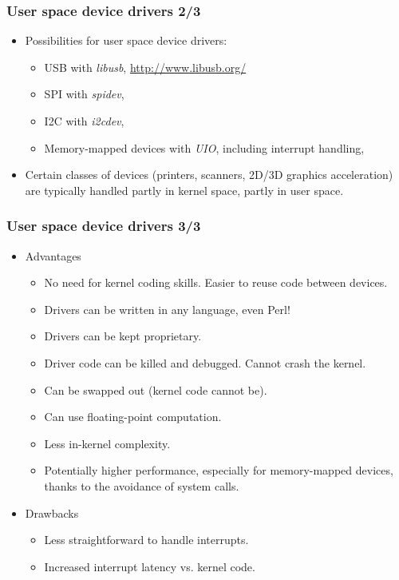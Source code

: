 \begin{frame}
  \frametitle{User space device drivers 2/3}
  \begin{itemize}
  \item Possibilities for user space device drivers:
    \begin{itemize}
    \item USB with {\em libusb}, \url{http://www.libusb.org/}
    \item SPI with {\em spidev}, 
    \item I2C with {\em i2cdev}, 
    \item Memory-mapped devices with {\em UIO}, including interrupt
      handling, 
    \end{itemize}
  \item Certain classes of devices (printers, scanners, 2D/3D graphics
    acceleration) are typically handled partly in kernel space, partly
    in user space.
  \end{itemize}
\end{frame}

\begin{frame}
  \frametitle{User space device drivers 3/3}
  \begin{itemize}
  \item Advantages
    \begin{itemize}
    \item No need for kernel coding skills. Easier to reuse code
      between devices.
    \item Drivers can be written in any language, even Perl!
    \item Drivers can be kept proprietary.
    \item Driver code can be killed and debugged. Cannot crash the
      kernel.
    \item Can be swapped out (kernel code cannot be).
    \item Can use floating-point computation.
    \item Less in-kernel complexity.
    \item Potentially higher performance, especially for
      memory-mapped devices, thanks to the avoidance of system calls.
    \end{itemize}
  \item Drawbacks
    \begin{itemize}
    \item Less straightforward to handle interrupts.
    \item Increased interrupt latency vs. kernel code.
    \end{itemize}
  \end{itemize}
\end{frame}
